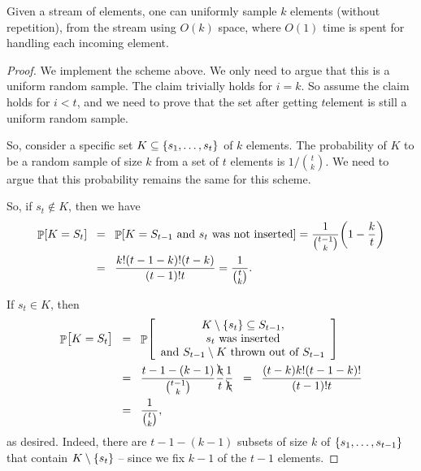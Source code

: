 \begin{theorem}
    Given a stream of elements, one can uniformly sample $k$ elements
    (without repetition), from the stream using $O(k)$ space, where
    $O(1)$ time is spent for handling each incoming element.
\end{theorem}
\begin{proof}
    We implement the scheme   above. We only
    need to argue that this is a uniform random sample. The claim
    trivially holds for $i=k$. So assume the claim holds for $i <t$,
    and we need to prove that the set after getting $t$\th element is
    still a uniform random sample.

    So, consider a specific set $K \subseteq \left\{ {s_1,\ldots, s_t} \right\}$ of
    $k$ elements.  The probability of $K$ to be a random sample of
    size $k$ from a set of $t$ elements is $1/\binom{t}{k}$. We need
    to argue that this probability remains the same for this scheme.
    
    So, if $s_t \notin K$, then we have
    \begin{align*}
        \Prob{K = S_t}%
        &\EQ%
        \Prob{K = S_{t-1} \text{ and } s_t \text{ was not inserted}}%
        =%
        \frac{1}{\binom{t-1}{k}} \pth{ 1-\frac{k}{t}}
        \\&%
        \EQ%
        \frac{k! (t-1-k)! ( t-k)}{(t-1)! t}
        =%
        \frac{1}{\binom{t}{k}}.        
    \end{align*}
    
    If $s_t \in K$, then
    \begin{align*}
        \Prob{\bigl. K = S_t}%
        &\EQ%
        \Prob{
           \begin{array}{c}
             K \setminus \brc{s_t} \subseteq S_{t-1},\\
             s_t \text{ was inserted}\\
             \text{and } S_{t-1}\setminus K \text{ thrown out of } S_{t-1}
           \end{array}
        }%
        \\&
        \EQ%
        \frac{t-1-(k-1)}{\binom{t-1}{k}}%
        \frac{\bcancel{k}}{t}
        \frac{1}{\bcancel{k}}
        \EQ%
        \frac{(t-k) k! (t-1-k)! }{(t-1)! t}        
        \\&
        \EQ%
        \frac{1}{\binom{t}{k}},
    \end{align*}
    as desired. Indeed, there are $t-1-(k-1)$ subsets of size $k$ of
    $\left\{ {s_1, \ldots, s_{t-1}} \right\}$ that contain
    $ K \setminus \left\{ {s_t} \right\}$ -- since we fix $k-1$ of the $t-1$
    elements.
\end{proof}


